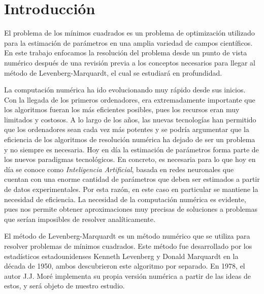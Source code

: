 \documentclass[11pt,a4paper]{book}
\theoremstyle{definition}
\theoremstyle{remark}
\begin{document}
\clearpage

\thispagestyle{empty}


\chapter*{Introducci\'on}

El problema de los mínimos cuadrados es un problema de optimización utilizado para la estimación de parámetros en una amplia variedad de campos científicos. En este trabajo enfocamos la resolución del problema desde un punto de vista numérico después de una revisión previa a los conceptos necesarios para llegar al método de Levenberg-Marquardt, el cual se estudiará en profundidad. 

La computación numérica ha ido evolucionando muy rápido desde sus inicios. Con la llegada de los primeros ordenadores, era extremadamente importante que los algoritmos fueran los más eficientes posibles, pues los recursos eran muy limitados y costosos. A lo largo de los años, las nuevas tecnologías han permitido que los ordenadores sean cada vez más potentes y se podría argumentar que la eficiencia de los algoritmos de resolución numérica ha dejado de ser un problema y no siempre es necesaria.
Hoy en día la estimación de parámetros forma parte de los nuevos paradigmas tecnológicos. En concreto, es necesaria para lo que hoy en día se conoce como \textit{Inteligencia Artificial}, basada en redes neuronales que cuentan con una enorme cantidad de parámetros que deben ser estimados a partir de datos experimentales. Por esta razón, en este caso en particular se mantiene la necesidad de eficiencia.
La necesidad de la computación numérica es evidente, pues nos permite obtener aproximaciones muy precisas de soluciones a problemas que serían imposibles de resolver analíticamente.

El método de Levenberg-Marquardt es un método numérico que se utiliza para resolver problemas de mínimos cuadrados. Este método fue desarrollado por los estadísticos estadounidenses Kenneth Levenberg \cite{Levenberg1944-wb} y Donald Marquardt \cite{Marquardt1963-ds} en la década de 1950, ambos descubrieron este algoritmo por separado. En 1978, el autor J.J. Moré implementa su propia versión numérica a partir de las ideas de estos, y será objeto de nuestro estudio.
\end{document}
